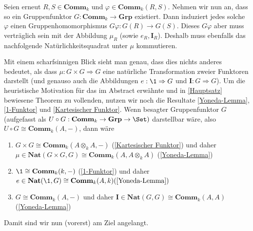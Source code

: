 \documentclass[11pt]{article}
\newcommand{\Comm}{\mathbf{Comm}}
\newcommand{\Nat}{\mathbf{Nat}}
\newcommand{\Grp}{\mathbf{Grp}}
\newcommand{\Ibold}{\mathbf{I}}
\begin{document}
Seien erneut $R,S\in \Comm_k$ und $\varphi \in \Comm_k(R,S)$. Nehmen wir nun an, dass so ein Gruppenfunktor $G: \Comm_k \to \Grp$ existiert. Dann induziert 
jedes solche $\varphi$ einen Gruppenhomomorphismus $G\varphi: G(R)\to G(S)$. Dieses $G\varphi$ aber muss verträglich sein mit der Abbildung $\mu_R$ (sowie $e_R,\Ibold_R$).
Deshalb muss ebenfalls das nachfolgende Natürlichkeitsquadrat unter $\mu$ kommutieren.
    \begin{figure}[H]
        \centering
    \end{figure}
    \newpage





















Mit einem scharfsinnigen Blick sieht man genau, dass dies nichts anderes bedeutet, als dass $\mu: G\times G \Rightarrow G$ eine natürliche Transformation zweier Funktoren darstellt
(und genauso auch die Abbildungen $e: \1 \Rightarrow G$ und $\Ibold: G\Rightarrow G$).
Um die heuristische Motivation für das im Abstract erwähnte und in \ref{Hauptsatz} bewiesene Theorem zu vollenden, nutzen wir noch die Resultate \ref{Yoneda-Lemma}, \ref{1-Funktor} und \ref{Kartesischer Funktor}.
Wenn besagter Gruppenfunktor $G$ (aufgefasst als $U\circ G: \Comm_k \to \Grp \to \Set)$ darstellbar wäre, also $U\circ G\cong \Comm_k(A,-)$, dann wäre 
\begin{enumerate}
    \item $G\times G \cong \Comm_k(A\otimes_k A, -)$ (\ref{Kartesischer Funktor}) und daher $\mu \in \Nat(G\times G, G) \cong \Comm_k(A, A\otimes_k A)$ (\ref{Yoneda-Lemma})
    \item $\1 \cong \Comm_k(k,-)$ (\ref{1-Funktor}) und daher $e\in \Nat(\1, G) \cong \Comm_k(A,k) (\ref{Yoneda-Lemma})$
    \item $G\cong \Comm_k(A,-)$ und daher $\Ibold \in \Nat(G,G) \cong \Comm_k(A,A)$ (\ref{Yoneda-Lemma})
\end{enumerate} 
Damit sind wir nun (vorerst) am Ziel angelangt.
\end{document}
